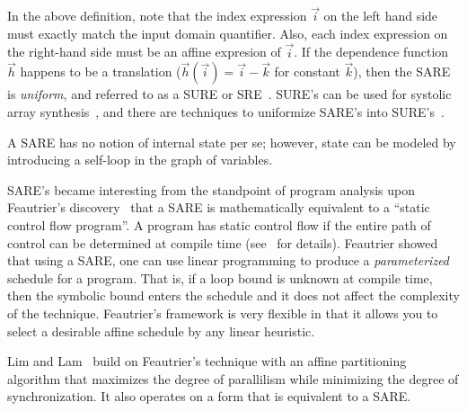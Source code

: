In the above definition, note that the index expression ${\vec i}$ on
the left hand side must exactly match the input domain quantifier.
Also, each index expression on the right-hand side must be an affine
expresion of ${\vec i}$.  If the dependence function ${\vec h}$
happens to be a translation (${\vec h}({\vec i}) = {\vec i} - {\vec
k}$ for constant ${\vec k}$), then the SARE is {\it uniform}, and
referred to as a SURE or SRE~\cite{Karp67}. SURE's can be used for
systolic array synthesis~\cite{Quinton84}, and there are techniques to
uniformize SARE's into SURE's~\cite{Manjun00}.

A SARE has no notion of internal state per se; however, state can be
modeled by introducing a self-loop in the graph of variables.

SARE's became interesting from the standpoint of program analysis upon
Feautrier's discovery~\cite{Feautrier92i,Feautrier92ii} that a SARE is
mathematically equivalent to a ``static control flow program''.  A
program has static control flow if the entire path of control can be
determined at compile time (see~\cite{Feautrier92i,DRV00} for details).
Feautrier showed that using a SARE, one can use linear programming to
produce a {\it parameterized} schedule for a program.  That is, if a
loop bound is unknown at compile time, then the symbolic bound enters
the schedule and it does not affect the complexity of the technique.
Feautrier's framework is very flexible in that it allows you to select
a desirable affine schedule by any linear heuristic.

Lim and Lam~\cite{Lim01} build on Feautrier's technique with an affine
partitioning algorithm that maximizes the degree of parallilism while
minimizing the degree of synchronization.  It also operates on a form
that is equivalent to a SARE.
